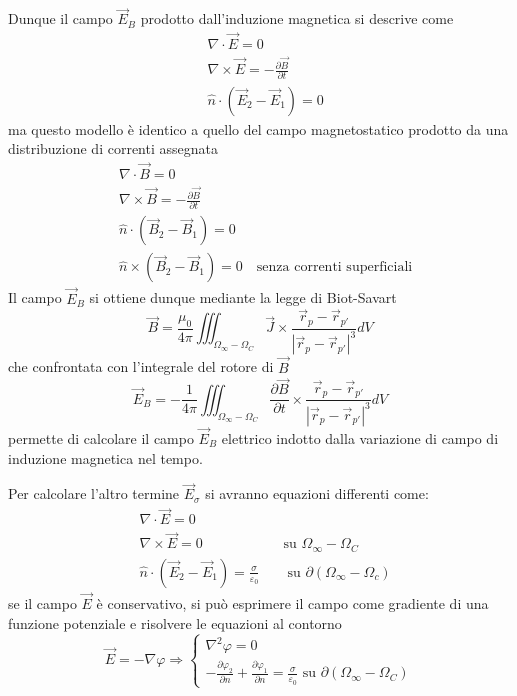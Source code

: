 Dunque il campo $\vec{E}_B$ prodotto dall'induzione magnetica si descrive come
$$
\begin{aligned}
&\nabla\cdot\vec{E}=0\\
&\nabla\times\vec{E} = -\frac{\partial \vec{B}}{\partial t}\\
&\hat{n}\cdot\left( \vec{E}_2-\vec{E}_1  \right) = 0
\end{aligned}
$$
ma questo modello è identico a quello del campo magnetostatico prodotto da una
distribuzione di correnti assegnata
$$\begin{aligned}
&\nabla\cdot\vec{B}=0\\
&\nabla\times\vec{B} = -\frac{\partial \vec{B}}{\partial t}\\
&\hat{n}\cdot\left( \vec{B}_2-\vec{B}_1  \right) = 0\\
&\hat{n}\times\left(\vec{B}_2-\vec{B}_1\right) = 0 \quad \text{senza correnti superficiali}
\end{aligned}
$$
Il campo $\vec{E}_B$ si ottiene dunque mediante la legge di Biot-Savart
$$
\vec{B} = \frac{\mu_0}{4\pi} \iiint_{\Omega_\infty - \Omega_C} \vec{J}\times
\frac{\vec{r}_p-\vec{r}_{p'}}{|\vec{r}_p-\vec{r}_{p'}|^3} dV
$$
che confrontata con l'integrale del rotore di $\vec{B}$
$$
\vec{E}_B = -\frac{1}{4 \pi} \iiint_{\Omega_\infty - \Omega_C} \frac{\partial\vec{B}}{\partial t} \times \frac{\vec{r}_p - \vec{r}_{p'}}{\left|\vec{r}_p - \vec{r}_{p'}\right|^3} dV
$$
permette di calcolare il campo $\vec{E}_B$ elettrico indotto dalla variazione di campo
di induzione magnetica nel tempo.

Per calcolare l'altro termine $\vec{E}_\sigma$ si avranno equazioni differenti come:
$$
\begin{aligned}
&\nabla\cdot\vec{E}=0\\
&\nabla\times\vec{E} = 0\qquad\qquad\quad\ \ \text{ su }\Omega_\infty-\Omega_C\\
&\hat{n}\cdot\left(\vec{E}_2-\vec{E}_1\right) = \frac{\sigma}{\varepsilon_0}\qquad \text{su }\partial\left(\Omega_\infty-\Omega_c\right)
\end{aligned}
$$
se il campo $\vec{E}$ è conservativo, si può esprimere il campo come gradiente di una funzione potenziale e risolvere le equazioni al contorno
$$
\vec{E}=-\nabla\varphi \Rightarrow \begin{cases}
\nabla^2 \varphi = 0\\
-\frac{\partial \varphi_2}{\partial n} + \frac{\partial \varphi_1}{\partial n} = \frac{\sigma}{\varepsilon_0} \text{ su } \partial\left(\Omega_\infty - \Omega_C\right)
\end{cases}
$$


